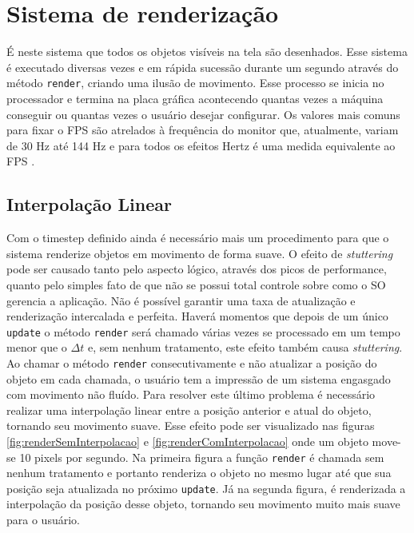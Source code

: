 \documentclass[12pt, 
openright, 
oneside, 
a4paper,    
brazil]{facom-ufu-abntex2}
\begin{document}
\section{Sistema de renderização}
É neste sistema que todos os objetos visíveis na tela são desenhados. Esse sistema é executado diversas vezes e em rápida sucessão durante um segundo através do método \texttt{render}, criando uma ilusão de movimento. Esse processo se inicia no processador e termina na placa gráfica acontecendo quantas vezes a máquina conseguir ou quantas vezes o usuário desejar configurar. Os valores mais comuns para fixar o FPS são atrelados à frequência do monitor que, atualmente, variam de 30 Hz até 144 Hz e para todos os efeitos Hertz é uma medida equivalente ao FPS \cite{GameEngineArchitecture}.

\subsection{Interpolação Linear} 
Com o timestep definido ainda é necessário mais um procedimento para que o sistema renderize objetos em movimento de forma suave. O efeito de \textit{stuttering} pode ser causado tanto pelo aspecto lógico, através dos picos de performance, quanto pelo simples fato de que não se possui total controle sobre como o SO gerencia a aplicação. Não é possível garantir uma taxa de atualização e renderização intercalada e perfeita. Haverá momentos que depois de um único \texttt{update} o método \texttt{render} será chamado várias vezes se processado em um tempo menor que o $\Delta t$ e, sem nenhum tratamento, este efeito também causa \textit{stuttering}. Ao chamar o método \texttt{render} consecutivamente e não atualizar a posição do objeto em cada chamada, o usuário tem a impressão de um sistema engasgado com movimento não fluído.
Para resolver este último problema é necessário realizar uma interpolação linear entre a posição anterior e atual do objeto, tornando seu movimento suave. Esse efeito pode ser visualizado nas figuras \ref{fig:renderSemInterpolacao} e \ref{fig:renderComInterpolacao} onde um objeto move-se 10 pixels por segundo. Na primeira figura a função \texttt{render} é chamada sem nenhum tratamento e portanto renderiza o objeto no mesmo lugar até que sua posição seja atualizada no próximo \texttt{update}. Já na segunda figura, é renderizada a interpolação da posição desse objeto, tornando seu movimento muito mais suave para o usuário.
\end{document}
